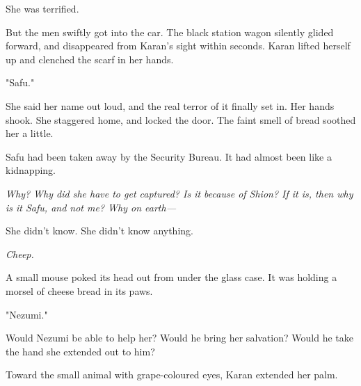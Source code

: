 She was terrified.

But the men swiftly got into the car. The black station wagon silently
glided forward, and disappeared from Karan's sight within seconds. Karan
lifted herself up and clenched the scarf in her hands.

"Safu."

She said her name out loud, and the real terror of it finally set in.
Her hands shook. She staggered home, and locked the door. The faint
smell of bread soothed her a little.

Safu had been taken away by the Security Bureau. It had almost been like
a kidnapping.

\emph{Why? Why did she have to get captured? Is it because of Shion? If it is,
then why is it Safu, and not me? Why on earth---}

She didn't know. She didn't know anything.

\emph{Cheep.}

A small mouse poked its head out from under the glass case. It was
holding a morsel of cheese bread in its paws.

"Nezumi."

Would Nezumi be able to help her? Would he bring her salvation? Would he
take the hand she extended out to him?

Toward the small animal with grape-coloured eyes, Karan extended her
palm.